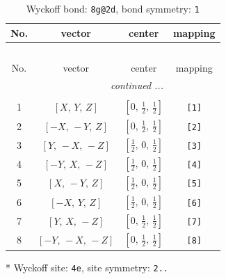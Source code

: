 \documentclass[fleqn,8pt]{jsarticle}
\begin{document}
\begin{longtable}{cccc}
\caption{Wyckoff bond: {\tt 8g@2d}, bond symmetry: {\tt 1}}
 \\
 \hline \hline
No. & vector & center & mapping \\ \hline \endfirsthead

\multicolumn{3}{l}{\tablename\ \thetable{}} \\
 \hline \hline
No. & vector & center & mapping \\ \hline \endhead

 \hline \hline
\multicolumn{3}{r}{\footnotesize\it continued ...} \\ \endfoot

 \hline \hline
\multicolumn{3}{r}{} \\ \endlastfoot

1 & $\left[ X,\, Y,\, Z \right]$ & $\left[ 0,\, \frac{1}{2},\, \frac{1}{2} \right]$ & {\tt [1]} \\ \hline
2 & $\left[ - X,\, - Y,\, Z \right]$ & $\left[ 0,\, \frac{1}{2},\, \frac{1}{2} \right]$ & {\tt [2]} \\ \hline
3 & $\left[ Y,\, - X,\, - Z \right]$ & $\left[ \frac{1}{2},\, 0,\, \frac{1}{2} \right]$ & {\tt [3]} \\ \hline
4 & $\left[ - Y,\, X,\, - Z \right]$ & $\left[ \frac{1}{2},\, 0,\, \frac{1}{2} \right]$ & {\tt [4]} \\ \hline
5 & $\left[ X,\, - Y,\, Z \right]$ & $\left[ \frac{1}{2},\, 0,\, \frac{1}{2} \right]$ & {\tt [5]} \\ \hline
6 & $\left[ - X,\, Y,\, Z \right]$ & $\left[ \frac{1}{2},\, 0,\, \frac{1}{2} \right]$ & {\tt [6]} \\ \hline
7 & $\left[ Y,\, X,\, - Z \right]$ & $\left[ 0,\, \frac{1}{2},\, \frac{1}{2} \right]$ & {\tt [7]} \\ \hline
8 & $\left[ - Y,\, - X,\, - Z \right]$ & $\left[ 0,\, \frac{1}{2},\, \frac{1}{2} \right]$ & {\tt [8]} \\
\end{longtable}
* Wyckoff site: {\tt 4e}, site symmetry: {\tt 2..}
\renewcommand{\arraystretch}{1.2}
\end{document}
